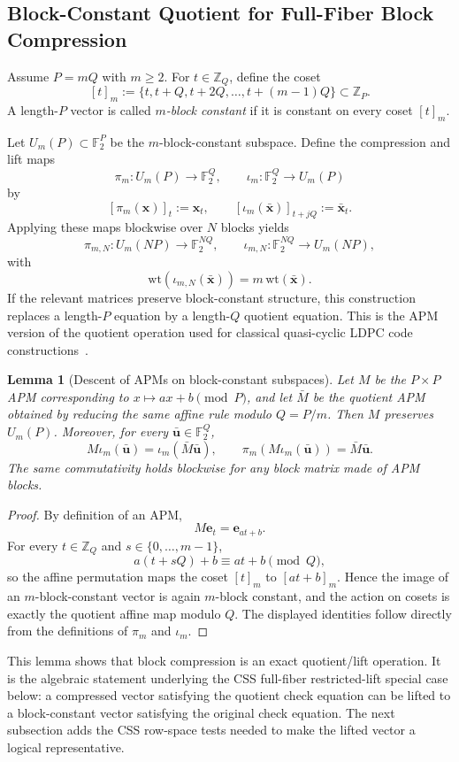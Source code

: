 \documentclass[11pt]{article}
\newcommand{\Ftwo}{\mathbb{F}_2}
\newcommand{\Z}{\mathbb{Z}}
\newcommand{\wt}{\mathrm{wt}}
\newcommand{\vect}[1]{\bm{#1}}
\newcommand{\vx}{\vect{x}}
\newcommand{\vu}{\vect{u}}
\newcommand{\ve}{\vect{e}}
\theoremstyle{uprightthm}
\newtheorem{lemma}[theorem]{Lemma}
\begin{document}
\subsection{Block-Constant Quotient for Full-Fiber Block Compression}
\label{sec:classical-mblock-en}

Assume $P=mQ$ with $m\ge 2$. For $t\in\Z_Q$, define the coset
\[
[t]_m:=\{t,t+Q,t+2Q,\dots,t+(m-1)Q\}\subset\Z_P.
\]
A length-$P$ vector is called \emph{$m$-block constant} if it is constant on every coset $[t]_m$.

Let $U_m(P)\subset \Ftwo^P$ be the $m$-block-constant subspace. Define the compression and lift maps
\[
\pi_m:U_m(P)\to\Ftwo^Q,\qquad \iota_m:\Ftwo^Q\to U_m(P)
\]
by
\[
[\pi_m(\vx)]_t:=\vx_t,\qquad
[\iota_m(\bar{\vx})]_{t+jQ}:=\bar{\vx}_t.
\]
Applying these maps blockwise over $N$ blocks yields
\[
\pi_{m,N}:U_m(NP)\to\Ftwo^{NQ},\qquad
\iota_{m,N}:\Ftwo^{NQ}\to U_m(NP),
\]
with
\[
\wt(\iota_{m,N}(\bar{\vx}))=m\,\wt(\bar{\vx}).
\]
If the relevant matrices preserve block-constant structure, this construction
replaces a length-$P$ equation by a length-$Q$ quotient equation.  This is the
APM version of the quotient operation used for classical quasi-cyclic LDPC code constructions~\cite{Fossorier2004,MitchellSmarandacheCostello2014}.

\begin{lemma}[Descent of APMs on block-constant subspaces]
\label{lem:apm-descent-en}
Let $M$ be the $P\times P$ APM corresponding to $x\mapsto ax+b\pmod P$, and let $\bar M$ be the quotient APM obtained by reducing the same affine rule modulo $Q=P/m$. Then $M$ preserves $U_m(P)$. Moreover, for every $\bar{\vu}\in\Ftwo^Q$,
\[
M\iota_m(\bar{\vu})=\iota_m(\bar M\bar{\vu}),\qquad
\pi_m(M\iota_m(\bar{\vu}))=\bar M\bar{\vu}.
\]
The same commutativity holds blockwise for any block matrix made of APM blocks.
\end{lemma}

\begin{proof}
By definition of an APM,
\[
M\ve_t=\ve_{at+b}.
\]
For every $t\in\Z_Q$ and $s\in\{0,\dots,m-1\}$,
\[
a(t+sQ)+b\equiv at+b\pmod Q,
\]
so the affine permutation maps the coset $[t]_m$ to $[at+b]_m$. Hence the image of an $m$-block-constant vector is again $m$-block constant, and the action on cosets is exactly the quotient affine map modulo $Q$. The displayed identities follow directly from the definitions of $\pi_m$ and $\iota_m$.
\end{proof}

This lemma shows that block compression is an exact quotient/lift operation.
It is the algebraic statement underlying the CSS full-fiber
restricted-lift special case below: a compressed vector satisfying the quotient
check equation can be lifted to a block-constant vector satisfying the original
check equation.
The next subsection adds the CSS row-space tests needed to make the lifted vector a logical representative.
\end{document}
